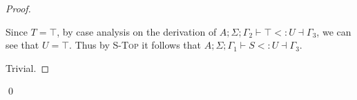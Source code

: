 \documentclass{llncs}
\numberwithin{subcase}{casethm}
\numberwithin{casethm}{theorem}
\numberwithin{casethm}{lemma}
\begin{document}
\begin{proof}
\begin{casethm}
Since $T = \top$, by case analysis on the derivation of 
$A; \Sigma; \Gamma_2 \vdash \top <: U \dashv \Gamma_3$,
we can see that $U = \top$. Thus by \textsc{S-Top} it follows that
$A; \Sigma; \Gamma_1 \vdash S <: U \dashv \Gamma_3$.
\end{casethm}

\begin{casethm}
\end{casethm}
Trivial.
\end{proof}
\qed

\newpage
\end{document}
